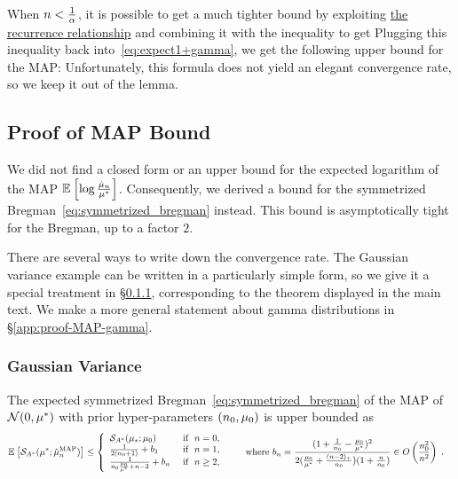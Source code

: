 When $n<\frac{1}{\alpha}$, it is possible to get a much tighter bound by exploiting \href{http://dlmf.nist.gov/8.19.E12}{the recurrence relationship} \cite[Eq.~8.19.12]{DLMF}
and combining it with the inequality \citep[Eq.~8.19.21]{DLMF} to get
Plugging this inequality back into~\eqref{eq:expect1+gamma}, we get the following upper bound for the MAP:
Unfortunately, this formula does not yield an elegant convergence rate, so we keep it out of the lemma. 


\subsection{Proof of MAP Bound}
\label{app:MAP-bound}

We did not find a closed form or an upper bound for the expected logarithm of the MAP $\mathbb{E}_{} \left[ \log\frac{\hat {\mu}_n}{\mu^*} \right] $.
Consequently, we derived a bound for the symmetrized Bregman~\eqref{eq:symmetrized_bregman} instead. 
This bound is asymptotically tight for the Bregman, up to a factor $2$.

There are several ways to write down the convergence rate. The Gaussian variance example can be written in a particularly simple form, so we give  it a special treatment in \S\ref{app:proof-MAP-gaussian}, corresponding to the theorem displayed in the main text.
We make a more general statement about gamma distributions in \S\ref{app:proof-MAP-gamma}.


\subsubsection{Gaussian Variance}
\label{app:proof-MAP-gaussian}

\begin{theorem}
The expected symmetrized Bregman~\eqref{eq:symmetrized_bregman} of the MAP of ${\mathcal N}(  0,\mu^*)$ with prior hyper-parameters $(n_0,\mu_0)$ is upper bounded as
 \begin{align}
	& \mathbb{E}_{} \left[ {\mathcal S}_{A^*}( \mu^*; \hat {\mu}_n^\mathrm{MAP}) \right] 
	\leq 
	\left\{\begin{array}{ll}
		{\mathcal S}_{A^*}( \mu_*; \mu_0) 					& \text{ if } \ n=0, \\
		\frac{1}{2(n_0+1)}  +  b_1 						& \text{ if }\ n=1,\\
		\frac{1}{n_0 \frac{\mu_0}{\mu^*} +n-2} + b_n  & \text{ if }\ n\geq 2,
	\end{array}\right.
	\quad 
	\quad 
	\text{where }
	b_n = \frac{(1 + \frac{1}{n_0} - \frac{\mu_0}{\mu^*})^2}{2 (\frac{\mu_0}{\mu^*}+\frac{(n-2)_+}{n_0})(1 + \frac{n}{n_0} )} \in O\left(\frac{n_0^2}{n^2}\right) \; . 
\end{align}
\end{theorem} 

